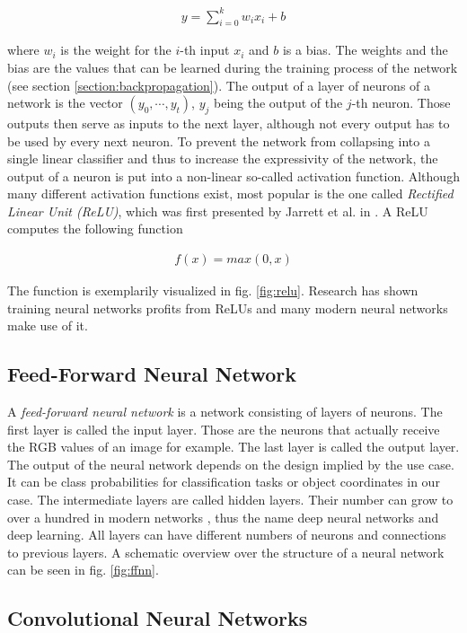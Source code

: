 \begin{align}
y = \sum\limits_{i=0}^kw_ix_i + b
\end{align}

where $w_i$ is the weight for the $i$-th input $x_i$ and $b$ is a bias. The weights and the bias are the values that can be learned during the training process of the network (see section \ref{section:backpropagation}). The output of a layer of neurons of a network is the vector $(y_0, \cdots, y_t)$, $y_j$ being the output of the $j$-th neuron. Those outputs then serve as inputs to the next layer, although not every output has to be used by every next neuron. To prevent the network from collapsing into a single linear classifier and thus to increase the expressivity of the network, the output of a neuron is put into a non-linear so-called activation function. Although many different activation functions exist, most popular is the one called \textit{Rectified Linear Unit (ReLU)}, which was first presented by Jarrett et al. in \cite{relu}. A ReLU computes the following function

\begin{align}
f(x) = max(0, x)
\end{align} 

The function is exemplarily visualized in fig. \ref{fig:relu}. Research has shown training neural networks profits from ReLUs \cite{boltzmann, deep_sparse} and many modern neural networks make use of it.

\subsection{Feed-Forward Neural Network}

A \textit{feed-forward neural network} is a network consisting of layers of neurons. The first layer is called the input layer. Those are the neurons that actually receive the RGB values of an image for example. The last layer is called the output layer. The output of the neural network depends on the design implied by the use case. It can be class probabilities for classification tasks or object coordinates in our case. The intermediate layers are called hidden layers. Their number can grow to over a hundred in modern networks \cite{resnet}, thus the name deep neural networks and deep learning. All layers can have different numbers of neurons and connections to previous layers. A schematic overview over the structure of a neural network can be seen in fig. \ref{fig:ffnn}. 

\subsection{Convolutional Neural Networks}

